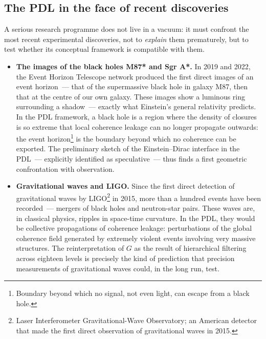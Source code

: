 \documentclass[12pt, a4paper, openright]{book}
\begin{document}
\subsection*{The PDL in the face of recent discoveries}

A serious research programme does not live in a vacuum: it must confront the most recent experimental discoveries, not to \emph{explain} them prematurely, but to test whether its conceptual framework is compatible with them.

\begin{itemize}

\item \textbf{The images of the black holes M87* and Sgr A*.} In 2019 and 2022, the Event Horizon Telescope network produced the first direct images of an event horizon~--- that of the supermassive black hole in galaxy M87, then that at the centre of our own galaxy. These images show a luminous ring surrounding a shadow~--- exactly what Einstein's general relativity predicts. In the PDL framework, a black hole is a region where the density of closures is so extreme that local coherence leakage can no longer propagate outwards: the event horizon\footnote{Boundary beyond which no signal, not even light, can escape from a black hole.} is the boundary beyond which no coherence can be exported. The preliminary sketch of the Einstein--Dirac interface in the PDL~--- explicitly identified as speculative~--- thus finds a first geometric confrontation with observation.

\item \textbf{Gravitational waves and LIGO.} Since the first direct detection of gravitational waves by LIGO\footnote{Laser Interferometer Gravitational-Wave Observatory; an American detector that made the first direct observation of gravitational waves in 2015.} in 2015, more than a hundred events have been recorded~--- mergers of black holes and neutron-star pairs. These waves are, in classical physics, ripples in space-time curvature. In the PDL, they would be collective propagations of coherence leakage: perturbations of the global coherence field generated by extremely violent events involving very massive structures. The reinterpretation of $G$ as the result of hierarchical filtering across eighteen levels is precisely the kind of prediction that precision measurements of gravitational waves could, in the long run, test.


\end{itemize}
\end{document}
